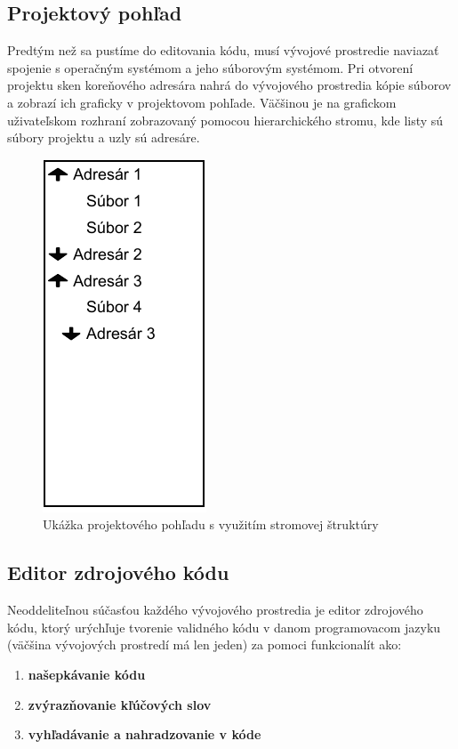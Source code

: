 	\subsection{Projektový pohľad}
	Predtým než sa pustíme do editovania kódu, musí vývojové prostredie naviazať spojenie s operačným systémom a jeho súborovým systémom. Pri otvorení projektu sken koreňového adresára nahrá do vývojového prostredia kópie súborov a zobrazí ich graficky v projektovom pohľade. Väčšinou je na grafickom uživateľskom rozhraní zobrazovaný pomocou hierarchického stromu, kde listy sú súbory projektu a uzly sú adresáre.
	
	\begin{figure}[H]
		\label{fig:ui-project-pane}
		\centering
		\includegraphics[scale=0.75]{obrazky-figures/UI-project-pane}
		\caption{Ukážka projektového pohľadu s využitím stromovej štruktúry}
	\end{figure}
	
	
	\subsection{Editor zdrojového kódu}
	\label{sec:TR-code-editor}
	Neoddeliteľnou súčasťou každého vývojového prostredia je editor zdrojového kódu, ktorý urýchľuje tvorenie validného kódu v danom programovacom jazyku (väčšina vývojových prostredí má len jeden) za pomoci funkcionalít ako:
	\begin{enumerate}
		\item \textbf{našepkávanie kódu}
		\item \textbf{zvýrazňovanie kľúčových slov}
		\item \textbf{vyhľadávanie a nahradzovanie v kóde}
	\end{enumerate}

